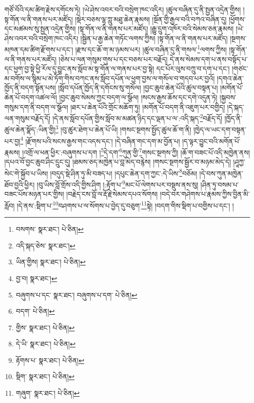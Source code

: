 གཙོ་བོའི་དམ་ཚིག་རྗེས་དགོངས་ཏེ། །ཡེ་ཤེས་འབར་བའི་བསྲེག་ཁང་འདིར། །ཚུལ་བཞིན་དུ་ནི་སྤྱན་འདྲེན་གྱིས། །སྟ་གོན་ལ་ནི་གནས་པར་མཛོད། །སྡེར་བཅས་ལྷ་ཀླུ་མཐུ་ཆེན་རྣམས། །སྔོན་གྱི་རྒྱལ་བའི་བཀའ་བཞིན་དུ། །ཕྱོགས་དང་མཚམས་སུ་སྤྱན་འདྲེན་གྱིས། །སྟ་གོན་ལ་ནི་གནས་པར་མཛོད། །རྒྱུ་དྲུག་འཁོར་བའི་སེམས་ཅན་རྣམས། །ཡེ་ཤེས་འབར་བའི་བསྲེག་ཁང་འདིར། །སྦྱིན་པ་རྒྱ་ཆེན་གཏོང་ལགས་ཀྱིས། །སྟ་གོན་ལ་ནི་གནས་པར་མཛོད། །སྔགས་མཁན་དམ་ཚིག་རྫོགས་པ་དང་། །རྫས་དང་ཆོ་ག་མ་ཉམས་པར། །ཚུལ་བཞིན་དུ་ནི་གསལ་\footnote{བསགས་  སྣར་ཐང་།  པེ་ཅིན། }ལགས་ཀྱིས། །སྟ་གོན་ལ་ནི་གནས་པར་མཛོད། །ཅེས་པ་ལན་གསུམ་གུས་པ་དང་བཅས་པར་བརྗོད། དེ་ནས་སེམས་དག་པ་ནས་བསྟོད་པ་དང་ཕྱག་བྱ་སྟེ་ཕྱི་རོལ་དུ་བྱུང་ནས་སློབ་མ་སྟ་གོན་ལ་གནས་པར་བྱ་སྟེ། དང་པོར་ལུས་བཀྲུ་བ་དག་པ་དང་། །གཙང་མ་བགོས་ལ་སྙིམ་པ་མེ་ཏོག་གིས་བཀང་ནས་སློབ་དཔོན་ལ་ཕྱག་བྱས་ལ་གསོལ་བ་གདབ་པར་བྱའོ། །དགའ་ཆེན་ཁྱོད་ནི་བདག་སྟོན་པས། །སློབ་དཔོན་ཁྱོད་ནི་དགོངས་སུ་གསོལ། །བྱང་ཆུབ་ཆེན་པོའི་ཚུལ་བསྟན་པ། །མགོན་པོ་ཆེན་པོ་བདག་འཚལ་ལོ། །བྱང་ཆུབ་སེམས་ཀྱང་བདག་ལ་སྩོལ། །སངས་རྒྱས་ཆོས་དང་དགེ་འདུན་ཏེ། །སྐྱབས་གསུམ་དག་ནི་བདག་ལ་སྩོལ། །ཐར་པ་ཆེན་པོའི་གྲོང་མཆོག་ཏུ། །མགོན་པོ་བདག་ནི་འཇུག་པར་བགྱིད། །དེ་སྐད་ལན་གསུམ་བརྗོད་དོ། །དེ་ནས་སློབ་དཔོན་གྱིས་སློབ་མ་མཚན་ཉིད་དང་ལྡན་པ་ལ་:འདི་སྐད་\footnote{འདི་སྐད་ཅེས་  སྣར་ཐང་། }བརྗོད་དོ། །ཁྱོད་ནི་ཚུལ་ཆེན་སྣོད་:ཡིན་གྱི།\footnote{ཡིན་གྱིས།  སྣར་ཐང་།  པེ་ཅིན། } །བུ་ཚུར་ཐེག་པ་ཆེན་པོ་ཡི། །གསང་སྔགས་སྤྱོད་ཚུལ་ཆོ་ག་ནི། །ཁྱེད་ལ་ཡང་དག་བསྟན་པར་བྱ།\footnote{བྱ་བ།  སྣར་ཐང་། } །རྫོགས་པའི་སངས་རྒྱས་གང་འདས་དང་། །དེ་བཞིན་གང་དག་མ་བྱོན་པ། །ད་ལྟར་བྱུང་བའི་མགོན་པོ་རྣམས། །འགྲོ་ལ་ཕན་ཕྱིར་:བཞུགས་པ་དག །\footnote{བཞུགས་པ་དང་  སྣར་ཐང་། བཞུགས་པ་དག་  པེ་ཅིན། }དེ་དག་\footnote{བདག་  པེ་ཅིན། }ཀུན་གྱི་\footnote{གྱིས་  སྣར་ཐང་།  པེ་ཅིན། }གསང་སྔགས་ཀྱི། །ཆོ་ག་བཟང་པོ་འདི་མཁྱེན་ནས། །དཔའ་བོ་བྱང་ཆུབ་ཤིང་དྲུང་དུ། །ཐམས་ཅད་མཁྱེན་པ་བླ་མེད་བརྙེས། །གསང་སྔགས་སྦྱོར་བ་མཉམ་མེད་དེ། །ཤཱཀྱ་སེང་གེ་སྐྱོབ་པ་ཡིས། །བདུད་སྡེ་ཤིན་ཏུ་མི་བཟད་པ། །དཔུང་ཆེན་དག་ཀྱང་:དེ་ཡིས་\footnote{དེ་ཡི་  སྣར་ཐང་།  པེ་ཅིན། }བཅོམ། །དེ་བས་ཀུན་མཁྱེན་ཐོབ་བྱའི་ཕྱིར། །བུ་ཡིས་བློ་གྲོས་འདི་གྱིས་ཤིག །:རྟོག་པ་\footnote{རྟོགས་པ་  སྣར་ཐང་།  པེ་ཅིན། }མང་པོ་ལེགས་པར་བསྡུས་ནས་སུ། །ཤིན་ཏུ་བསམ་པ་བཟང་པོས་མཉན་པར་གྱིས། །བརྗེད་ངས་བློ་ལ་རྡོ་རྗེ་སེམས་དཔའ་སོགས། །བདེ་བར་གཤེགས་པ་རྣམས་ཀྱིས་བྱིན་མི་རློབ། །དེ་ནས་:སྡིག་པ་\footnote{སྡིག་  སྣར་ཐང་།  པེ་ཅིན། }བཤགས་པ་ལ་སོགས་པ་བྱེད་དུ་བཅུག་\footnote{གཞུག་  སྣར་ཐང་།  པེ་ཅིན། }སྟེ། །བདག་གིས་སྡིག་པ་བགྱིས་པ་དང་། །
